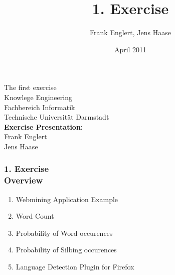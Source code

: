 \documentclass[accentcolor=tud1b,colorbacktitle,inverttitle,landscape,presentation,t]{tudbeamer}
\newcommand{\myframetitle}[2]{\frametitle{#1 \\[.2cm] \small #2}}
\begin{document}
\title[MGA]{\large 1. Exercise}

\author{Frank Englert, Jens Haase}


\date{April 2011}

\begin{titleframe}
\begin{center}
\color{tudtextaccent} \large The first exercise\\[.5cm]
\normalcolor \normalsize Knowlege Engineering \\
Fachbereich Informatik \\
Technische Universität Darmstadt\\[.5cm]

\textbf{Exercise Presentation:}\\
Frank Englert\\
Jens Haase
\end{center}

\end{titleframe} 

\begin{frame}[c]
	\myframetitle{1. Exercise}{Overview}
\begin{enumerate}
  \item Webmining Application Example
  \item Word Count
  \item Probability of Word occurences
  \item Probability of Silbing occurences
  \item Language Detection Plugin for Firefox
\end{enumerate}
\end{frame}






\end{document}
